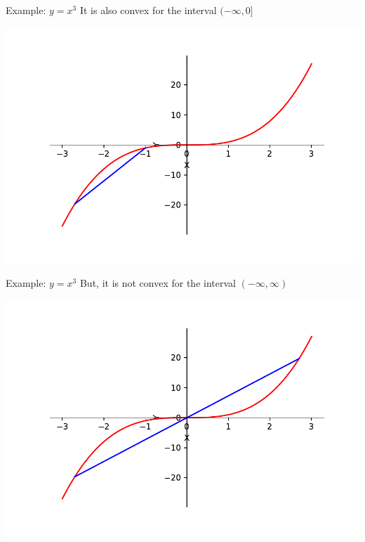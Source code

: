 \documentclass{beamer}
\begin{document}
	\begin{frame}{Example: $y = x^3$}
	It is also convex for the interval $(-\infty, 0]$
	\begin{center}
	\includegraphics[scale=0.5]{y-x3_neg}
	\end{center}
	\end{frame}

	\begin{frame}{Example: $y = x^3$}
	But, it is not convex for the interval $(-\infty, \infty)$
	\begin{center}
	\includegraphics[scale=0.5]{y-x3}
	\end{center}
	\end{frame}
\end{document}
